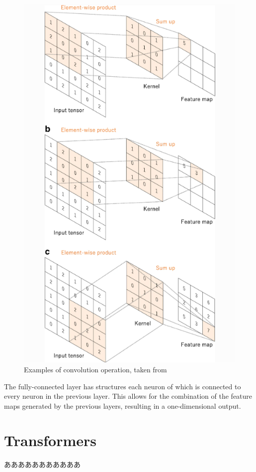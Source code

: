 \begin{figure}[p]
  \centering
  \includegraphics[width=110truemm]{resources/2_background/ex-convolution.png}
  \caption{
    Examples of convolution operation,
    taken from \cite{yamashita2018convolutional}
  }
  \label{convolution-process}
\end{figure}
\clearpage

The fully-connected layer has structures each neuron of which is connected 
to every neuron in the previous layer. This allows for the combination of 
the feature maps generated by the previous layers, resulting in a 
one-dimensional output.  

\section{Transformers}
あああああああああああ


